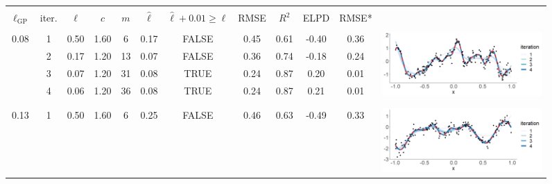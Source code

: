 \begin{figure}
\centering
\begin{tabular}{ c c c c c c c c c c | c c}
\arrayrulecolor{gray}\hline \\[-3mm]
$\ell_{\text{GP}}$ & iter. & $\ell$ & $c$ & $m$ & $\hat{\ell}$ & $\hat{\ell} + 0.01 \geq \ell$ & RMSE & $R^2$ & ELPD & RMSE* & \\ 
\arrayrulecolor{lightgray}\hline \\[-1mm]
\multirow{5}{*}{ 0.08} 
 & 1 & 0.50 & 1.60 & 6 & 0.17 & FALSE & 0.45 & 0.61 & -0.40 & 0.36 & \multirow{5}{*}{ \includegraphics[scale=0.20, trim = 0mm 10mm 0mm 5mm, clip]{fig9_diagnostic_2.png}}\\
 & 2 & 0.17 & 1.20 & 13 & 0.07 & FALSE & 0.36 & 0.74 & -0.18 & 0.24 & \\
 & 3 & 0.07 & 1.20 & 31 & 0.08 & TRUE & 0.24 & 0.87 & 0.20 & 0.01 & \\
 & 4 & 0.06 & 1.20 & 36 & 0.08 & TRUE & 0.24 & 0.87 & 0.21 & 0.01 & \\
 \\[1mm]
 \arrayrulecolor{lightgray}\hline \\[-1mm]
\multirow{3}{*}{ 0.13} 
 & 1 & 0.50 & 1.60 & 6 & 0.25 & FALSE & 0.46 & 0.63 & -0.49 & 0.33 & \multirow{5}{*}{ \includegraphics[scale=0.20, trim = 0mm 10mm 0mm 5mm, clip]{fig9_diagnostic_3.png}}\\

\end{tabular}
\end{figure}
